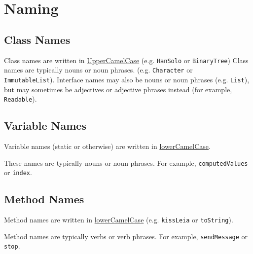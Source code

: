 \documentclass[10pt,DIV=23,landscape]{scrartcl}
\begin{document}
\section{Naming}\label{naming}

\begin{paracol}{3}
\begin{nthcolumn}{0}
\subsection{Class Names}\label{class-names}

Class names are written in
\href{https://google.github.io/styleguide/javaguide.html\#s5.3-camel-case}{UpperCamelCase}
(e.g. \lstinline{HanSolo} or \lstinline{BinaryTree}) Class names are typically
nouns or noun phrases. (e.g. \lstinline{Character} or
\\ \lstinline{ImmutableList}). Interface names may also be nouns or noun
phrases (e.g. \lstinline{List}), but may sometimes be adjectives or
adjective phrases instead (for example, \lstinline{Readable}).

\end{nthcolumn}
\begin{nthcolumn}{1}

\subsection{Variable Names}\label{variable-names}

Variable names (static or otherwise) are written in
\href{https://google.github.io/styleguide/javaguide.html\#s5.3-camel-case}{lowerCamelCase}.

These names are typically nouns or noun phrases. For example,
\lstinline{computedValues} or \lstinline{index}.

\end{nthcolumn}
\begin{nthcolumn}{2}
\subsection{Method Names}\label{method-names}

Method names are written in \href{https://google.github.io/styleguide/javaguide.html\#s5.3-camel-case}{lowerCamelCase}
(e.g. \lstinline{kissLeia} or \lstinline{toString}).

Method names are typically verbs or verb phrases. For example,
\lstinline{sendMessage} or \lstinline{stop}.
\end{nthcolumn}
\end{paracol}
\end{document}
